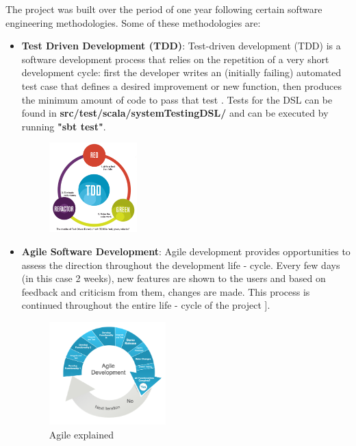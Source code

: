 The project was built over the period of one year following certain software engineering methodologies. Some of these methodologies are:
\begin{itemize}
\item \textbf{Test Driven Development (TDD)}: Test-driven development (TDD) is a software development process that relies on the repetition of a very short development cycle: first the developer writes an (initially failing) automated test case that defines a desired improvement or new function, then produces the minimum amount of code to pass that test \cite{tdd}. Tests for the DSL can be found in \textbf{src/test/scala/systemTestingDSL/} and can be executed by running \textbf{"sbt test"}.

\begin{figure}[H]
  \centering
    \includegraphics[height=130px]{figures/tdd.png}
\end{figure}

\item \textbf{Agile Software Development}: Agile development provides opportunities to assess the direction throughout the development life - cycle. Every few days (in this case 2 weeks), new features are shown to the users and based on feedback and criticism from them, changes are made. This process is continued throughout the entire life - cycle of the project ]\cite{agile}.

\begin{figure}[H]
  \centering
    \includegraphics[height=150px]{figures/agile.png}
  \caption{Agile explained}
\end{figure}
\end{itemize}

\newpage